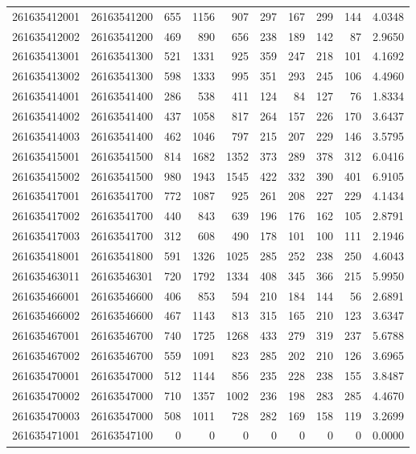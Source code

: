 \documentclass[
  11pt,
]{article}
\begin{document}
\begin{longtable}[t]{llrrrrrrrr}
261635412001 & 26163541200 & 655 & 1156 & 907 & 297 & 167 & 299 & 144 & 4.0348\\
261635412002 & 26163541200 & 469 & 890 & 656 & 238 & 189 & 142 & 87 & 2.9650\\
261635413001 & 26163541300 & 521 & 1331 & 925 & 359 & 247 & 218 & 101 & 4.1692\\
261635413002 & 26163541300 & 598 & 1333 & 995 & 351 & 293 & 245 & 106 & 4.4960\\
261635414001 & 26163541400 & 286 & 538 & 411 & 124 & 84 & 127 & 76 & 1.8334\\
261635414002 & 26163541400 & 437 & 1058 & 817 & 264 & 157 & 226 & 170 & 3.6437\\
261635414003 & 26163541400 & 462 & 1046 & 797 & 215 & 207 & 229 & 146 & 3.5795\\
261635415001 & 26163541500 & 814 & 1682 & 1352 & 373 & 289 & 378 & 312 & 6.0416\\
261635415002 & 26163541500 & 980 & 1943 & 1545 & 422 & 332 & 390 & 401 & 6.9105\\
261635417001 & 26163541700 & 772 & 1087 & 925 & 261 & 208 & 227 & 229 & 4.1434\\
261635417002 & 26163541700 & 440 & 843 & 639 & 196 & 176 & 162 & 105 & 2.8791\\
261635417003 & 26163541700 & 312 & 608 & 490 & 178 & 101 & 100 & 111 & 2.1946\\
261635418001 & 26163541800 & 591 & 1326 & 1025 & 285 & 252 & 238 & 250 & 4.6043\\
261635463011 & 26163546301 & 720 & 1792 & 1334 & 408 & 345 & 366 & 215 & 5.9950\\
261635466001 & 26163546600 & 406 & 853 & 594 & 210 & 184 & 144 & 56 & 2.6891\\
261635466002 & 26163546600 & 467 & 1143 & 813 & 315 & 165 & 210 & 123 & 3.6347\\
261635467001 & 26163546700 & 740 & 1725 & 1268 & 433 & 279 & 319 & 237 & 5.6788\\
261635467002 & 26163546700 & 559 & 1091 & 823 & 285 & 202 & 210 & 126 & 3.6965\\
261635470001 & 26163547000 & 512 & 1144 & 856 & 235 & 228 & 238 & 155 & 3.8487\\
261635470002 & 26163547000 & 710 & 1357 & 1002 & 236 & 198 & 283 & 285 & 4.4670\\
261635470003 & 26163547000 & 508 & 1011 & 728 & 282 & 169 & 158 & 119 & 3.2699\\
261635471001 & 26163547100 & 0 & 0 & 0 & 0 & 0 & 0 & 0 & 0.0000\\

\end{longtable}
\end{document}
